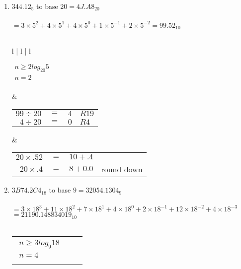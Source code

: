 \documentclass[12pt]{article}
\begin{document}
\begin{enumerate}
\begin{tabular}{l | l | l}
    \end{tabular}

    \item $344.12_{5}$ to base $20 = \boxed{4J.A8_{20}}$ \\ \\
    $ = 3 \times 5^2 + 4 \times 5^1 + 4 \times 5^0 + 1 \times 5^{-1} + 2 \times 5^{-2} = 99.52_{10}$ \\\\
    
       \begin{tabular}{l | l | l} 

       $\begin{aligned}
           n \geq 2log_{20}5 \\
           n = 2 \\
       \end{aligned}$

       &

       \begin{tabular}{r c l l}
           $99 \div 20$  & $=$ & $4$ & $R19$ \\
           $4 \div 20$  & $=$ & $0$ & $R4$  \\
       \end{tabular}

       &

       \begin{tabular}{r c l l}
           $20 \times .52$ & $=$ & $10 + .4$  & \\
           $20 \times .4$ & $=$ & $8 + 0.0$  & round down\\
       \end{tabular}
       
    \end{tabular}

    \item $3B74.2C4_{18}$ to base $9 = \boxed{32054.1304_{9}}$ \\ \\
    $ = 3 \times 18^3 + 11 \times 18^2 + 7 \times 18^1 + 4 \times 18^0 + 2 \times 18^{-1} + 12 \times 18^{-2} + 4 \times 18^{-3}$ \\
    $ = 21190.148834019_{10}$ \\\\
    
       \begin{tabular}{l | l | l} 

       $\begin{aligned}
           n \geq 3log_{9}18 \\
           n = 4 \\
       \end{aligned}$


\end{tabular}
\end{enumerate}
\end{document}
